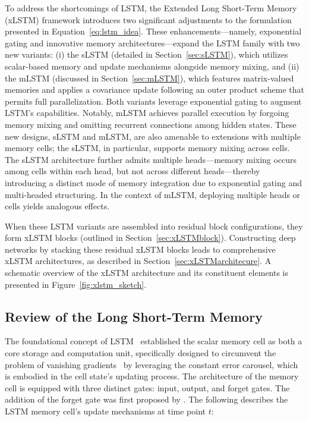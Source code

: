 To address the shortcomings of LSTM, the Extended Long Short-Term Memory (xLSTM) framework introduces two significant adjustments to the formulation presented in Equation~\eqref{eq:lstm_idea}. These enhancements—namely, exponential gating and innovative memory architectures—expand the LSTM family with two new variants: (i) the sLSTM (detailed in Section~\ref{sec:sLSTM}), which utilizes scalar-based memory and update mechanisms alongside memory mixing, and (ii) the mLSTM (discussed in Section~\ref{sec:mLSTM}), which features matrix-valued memories and applies a covariance update following an outer product scheme that permits full parallelization. Both variants leverage exponential gating to augment LSTM’s capabilities. Notably, mLSTM achieves parallel execution by forgoing memory mixing and omitting recurrent connections among hidden states. These new designs, sLSTM and mLSTM, are also amenable to extensions with multiple memory cells; the sLSTM, in particular, supports memory mixing across cells. The sLSTM architecture further admits multiple heads—memory mixing occurs among cells within each head, but not across different heads—thereby introducing a distinct mode of memory integration due to exponential gating and multi-headed structuring. In the context of mLSTM, deploying multiple heads or cells yields analogous effects.

When these LSTM variants are assembled into residual block configurations, they form xLSTM blocks (outlined in Section~\ref{sec:xLSTMblock}). Constructing deep networks by stacking these residual xLSTM blocks leads to comprehensive xLSTM architectures, as described in Section~\ref{sec:xLSTMarchitecure}. A schematic overview of the xLSTM architecture and its constituent elements is presented in Figure~\ref{fig:xlstm_sketch}.

\subsection{Review of the Long Short-Term Memory}
\label{sec:orgLSTM}

The foundational concept of LSTM~\citep{Hochreiter:91,Hochreiter:97nips,Hochreiter:97} established the scalar memory cell as both a core storage and computation unit, specifically designed to circumvent the problem of vanishing gradients~\citep{Hochreiter:91,Hochreiter:00book} by leveraging the constant error carousel, which is embodied in the cell state’s updating process. The architecture of the memory cell is equipped with three distinct gates: input, output, and forget gates. The addition of the forget gate was first proposed by \citet{Gers:00}. The following describes the LSTM memory cell’s update mechanisms at time point $t$:

